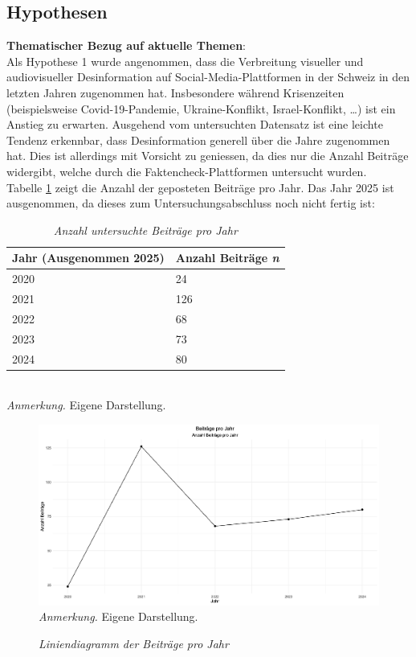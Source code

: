 \documentclass[12pt,a4paper]{article}        %
\begin{document}
\subsection{Hypothesen}
\textbf{Thematischer Bezug auf aktuelle Themen}:\\
Als Hypothese 1 wurde angenommen, dass die Verbreitung visueller und audiovisueller Desinformation auf Social-Media-Plattformen in der Schweiz in den letzten Jahren zugenommen hat. Insbesondere während Krisenzeiten (beispielsweise Covid-19-Pandemie, Ukraine-Konflikt, Israel-Konflikt, …) ist ein Anstieg zu erwarten.
Ausgehend vom untersuchten Datensatz ist eine leichte Tendenz erkennbar, dass Desinformation generell über die Jahre zugenommen hat. Dies ist allerdings mit Vorsicht zu geniessen, da dies nur die Anzahl Beiträge widergibt, welche durch die Faktencheck-Plattformen untersucht wurden.\\
Tabelle \ref{tab:results_posts_per_year} zeigt die Anzahl der geposteten Beiträge pro Jahr. Das Jahr 2025 ist ausgenommen, da dieses zum Untersuchungsabschluss noch nicht fertig ist:
\begin{table}[H]
  \caption{\textit{Anzahl untersuchte Beiträge pro Jahr}}
  \label{tab:results_posts_per_year}
  \centering
  \begin{tabular}{|l|l|} \hline
    \textbf{Jahr} (Ausgenommen 2025) & \textbf{Anzahl Beiträge \textit{n}}\\ \hline
    2020& 24\\ \hline
    2021& 126\\ \hline
    2022& 68\\ \hline
    2023&73\\\hline
    2024&80\\\hline
  \end{tabular}\\
  \footnotesize\textit{Anmerkung.} Eigene Darstellung.
\end{table}
\begin{figure}[H]
    \caption{\textit{Liniendiagramm der Beiträge pro Jahr}}
    \label{fig:results_posts_per_year_plot}
    \centering
    \includegraphics[width=0.75\linewidth]{images/posts_per_year_plot.png} \\
      \footnotesize\textit{Anmerkung.} Eigene Darstellung.
\end{figure}
\end{document}
